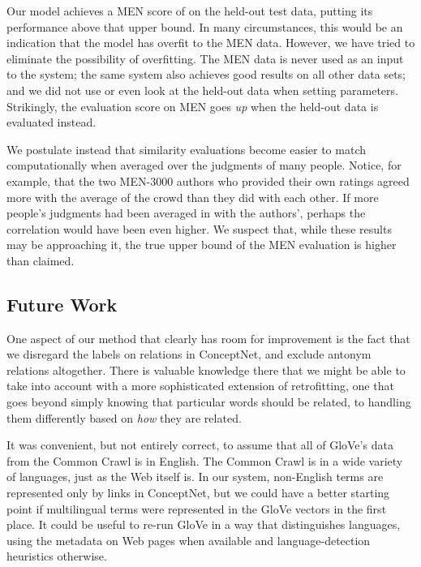 \documentclass[11pt,letterpaper]{article}
\begin{document}
Our model achieves a MEN score of \scoreMEN{} on the
held-out test data, putting its performance above that upper bound. In many
circumstances, this would be an indication that the model has overfit to the
MEN data. However, we have tried to eliminate the possibility of overfitting.
The MEN data is never used as an input to the system; the same system also
achieves good results on all other data sets; and we did not use or even
look at the held-out data when setting parameters. Strikingly, the evaluation
score on MEN goes {\em up} when the held-out data is evaluated instead.

We postulate instead that similarity evaluations become easier to match
computationally when averaged over the judgments of many people. Notice, for
example, that the two MEN-3000 authors who provided their own ratings
agreed more with the average of the crowd than they did with each other.
If more people's judgments had been averaged in with the authors', perhaps the
correlation would have been even higher. We suspect that, while these results
may be approaching it, the true upper bound of the MEN evaluation is higher than
claimed.

\subsection{Future Work}


One aspect of our method that clearly has room for improvement is the fact that
we disregard the labels on relations in ConceptNet, and exclude antonym
relations altogether. There is valuable knowledge there that we might be able
to take into account with a more sophisticated extension of retrofitting, one
that goes beyond simply knowing that particular words should be related, to
handling them differently based on {\em how} they are related.

It was convenient, but not entirely correct, to assume that all of GloVe's data
from the Common Crawl is in English. The Common Crawl is in a wide variety of
languages, just as the Web itself is. In our system, non-English terms are
represented only by links in ConceptNet, but we could have a better starting
point if multilingual terms were represented in the GloVe vectors in the first
place. It could be useful to re-run GloVe in a way that distinguishes languages,
using the metadata on Web pages when available and language-detection heuristics
otherwise.
\end{document}
